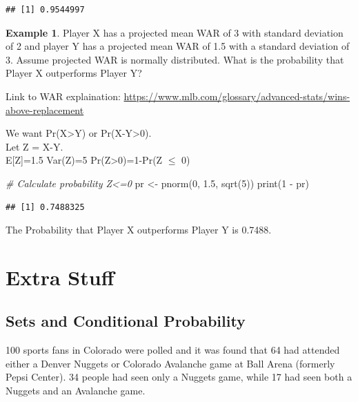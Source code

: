 \documentclass[
  11pt,
]{book}
\newenvironment{Shaded}{\begin{snugshade}}{\end{snugshade}}
\newcommand{\CommentTok}[1]{\textcolor[rgb]{0.56,0.35,0.01}{\textit{#1}}}
\newcommand{\DecValTok}[1]{\textcolor[rgb]{0.00,0.00,0.81}{#1}}
\newcommand{\FloatTok}[1]{\textcolor[rgb]{0.00,0.00,0.81}{#1}}
\newcommand{\FunctionTok}[1]{\textcolor[rgb]{0.00,0.00,0.00}{#1}}
\newcommand{\NormalTok}[1]{#1}
\newcommand{\OtherTok}[1]{\textcolor[rgb]{0.56,0.35,0.01}{#1}}
\newcommand{\SpecialCharTok}[1]{\textcolor[rgb]{0.00,0.00,0.00}{#1}}
\theoremstyle{definition}
\theoremstyle{definition}
\newtheorem{example}{Example}[chapter]
\theoremstyle{definition}
\theoremstyle{definition}
\theoremstyle{remark}
\begin{document}
\begin{verbatim}
## [1] 0.9544997
\end{verbatim}

\newpage

\begin{example}
Player X has a projected mean WAR of 3 with standard deviation of 2 and player Y has a projected mean WAR of 1.5 with a standard deviation of 3. Assume projected WAR is normally distributed. What is the probability that Player X outperforms Player Y?

Link to WAR explaination: \url{https://www.mlb.com/glossary/advanced-stats/wins-above-replacement}
\end{example}

We want Pr(X\textgreater Y) or Pr(X-Y\textgreater0).\\
Let Z = X-Y.\\
E{[}Z{]}=1.5
Var(Z)=5
Pr(Z\textgreater0)=1-Pr(Z \(\leq\) 0)

\begin{Shaded}
\begin{Highlighting}[]
\CommentTok{\# Calculate probability Z\textless{}=0}
\NormalTok{pr }\OtherTok{\textless{}{-}} \FunctionTok{pnorm}\NormalTok{(}\DecValTok{0}\NormalTok{, }\FloatTok{1.5}\NormalTok{, }\FunctionTok{sqrt}\NormalTok{(}\DecValTok{5}\NormalTok{))}
\FunctionTok{print}\NormalTok{(}\DecValTok{1} \SpecialCharTok{{-}}\NormalTok{ pr)}
\end{Highlighting}
\end{Shaded}

\begin{verbatim}
## [1] 0.7488325
\end{verbatim}

The Probability that Player X outperforms Player Y is 0.7488.

\newpage

\hypertarget{extra-stuff}{%
\section{Extra Stuff}\label{extra-stuff}}

\hypertarget{sets-and-conditional-probability}{%
\subsection{Sets and Conditional Probability}\label{sets-and-conditional-probability}}

100 sports fans in Colorado were polled and it was found that 64 had attended either a Denver Nuggets or Colorado Avalanche game at Ball Arena (formerly Pepsi Center). 34 people had seen only a Nuggets game, while 17 had seen both a Nuggets and an Avalanche game.
\end{document}
